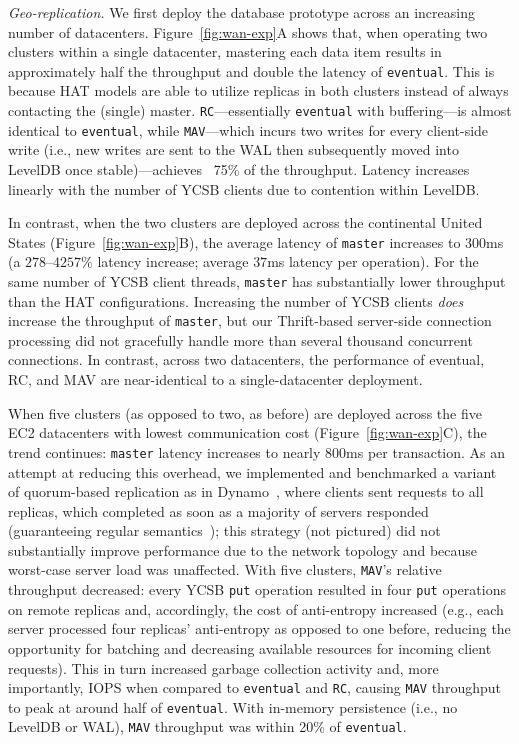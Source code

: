 \vspace{.5em}\noindent\textit{Geo-replication.} We first deploy the
database prototype across an increasing number of
datacenters. Figure~\ref{fig:wan-exp}A shows that, when operating two
clusters within a single datacenter, mastering each data item results
in approximately half the throughput and double the latency of
\texttt{eventual}. This is because HAT models are able to utilize
replicas in both clusters instead of always contacting the (single)
master. \texttt{RC}---essentially \texttt{eventual} with
buffering---is almost identical to \texttt{eventual}, while
\texttt{MAV}---which incurs two writes for every client-side write
(i.e., new writes are sent to the WAL then subsequently moved into
LevelDB once stable)---achieves ~75\% of the throughput. Latency
increases linearly with the number of YCSB clients due to contention
within LevelDB.

In contrast, when the two clusters are deployed across the continental
United States (Figure~\ref{fig:wan-exp}B), the average latency of
\texttt{master} increases to $300$ms (a $278$--$4257\%$ latency
increase; average $37$ms latency per operation). For the same number
of YCSB client threads, \texttt{master} has substantially lower
throughput than the HAT configurations. Increasing the number of YCSB
clients \textit{does} increase the throughput of \texttt{master}, but
our Thrift-based server-side connection processing did not gracefully
handle more than several thousand concurrent connections. In contrast,
across two datacenters, the performance of eventual, RC, and MAV are
near-identical to a single-datacenter deployment.

When five clusters (as opposed to two, as before) are deployed across
the five EC2 datacenters with lowest communication cost
(Figure~\ref{fig:wan-exp}C), the trend continues: \texttt{master}
latency increases to nearly $800$ms per transaction. As an attempt at
reducing this overhead, we implemented and benchmarked a variant of
quorum-based replication as in Dynamo~\cite{dynamo}, where clients
sent requests to all replicas, which completed as soon as a majority
of servers responded (guaranteeing regular
semantics~\cite{herlihy-art}); this strategy (not pictured) did not
substantially improve performance due to the network topology and
because worst-case server load was unaffected. With five clusters,
\texttt{MAV}'s relative throughput decreased: every YCSB \texttt{put}
operation resulted in four \texttt{put} operations on remote replicas
and, accordingly, the cost of anti-entropy increased (e.g., each
server processed four replicas' anti-entropy as opposed to one before,
reducing the opportunity for batching and decreasing available
resources for incoming client requests). This in turn increased
garbage collection activity and, more importantly, IOPS when compared
to \texttt{eventual} and \texttt{RC}, causing \texttt{MAV} throughput
to peak at around half of \texttt{eventual}. With in-memory
persistence (i.e., no LevelDB or WAL), \texttt{MAV} throughput was
within 20\% of \texttt{eventual}.

